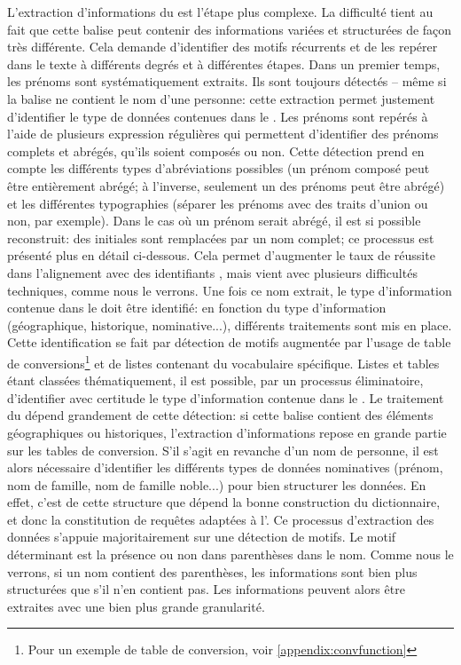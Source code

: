 L'extraction d'informations du \tname{} est l'étape plus complexe. La difficulté tient au fait que cette balise peut contenir des informations variées et structurées de façon très différente. Cela demande d'identifier des motifs récurrents et de les repérer dans le texte à différents degrés et à différentes étapes. Dans un premier temps, les prénoms sont systématiquement extraits. Ils sont toujours détectés -- même si la balise ne contient le nom d'une personne: cette extraction permet justement d'identifier le type de données contenues dans le \tname{}. Les prénoms sont repérés à l'aide de plusieurs \glspl{expression régulière} qui permettent d'identifier des prénoms complets et abrégés, qu'ils soient composés ou non. Cette détection prend en compte les différents types d'abréviations possibles (un prénom composé peut être entièrement abrégé; à l'inverse, seulement un des prénoms peut être abrégé) et les différentes typographies (séparer les prénoms avec des traits d'union ou non, par exemple). Dans le cas où un prénom serait abrégé, il est si possible reconstruit: des initiales sont remplacées par un nom complet; ce processus est présenté plus en détail ci-dessous. Cela permet d'augmenter le taux de réussite dans l'alignement avec des identifiants \wkd{}, mais vient avec plusieurs difficultés techniques, comme nous le verrons. Une fois ce nom extrait, le type d'information contenue dans le \tname{} doit être identifié: en fonction du type d'information (géographique, historique, nominative...), différents traitements sont mis en place. Cette identification se fait par détection de motifs augmentée par l'usage de \glspl{table de conversion}\footnote{Pour un exemple de table de conversion, voir \ref{appendix:convfunction}} et de listes contenant du vocabulaire spécifique. Listes et tables étant classées thématiquement, il est possible, par un processus éliminatoire, d'identifier avec certitude le type d'information contenue dans le \tname{}. Le traitement du \tname{} dépend grandement de cette détection: si cette balise contient des éléments géographiques ou historiques, l'extraction d'informations repose en grande partie sur les tables de conversion. S'il s'agit en revanche d'un nom de personne, il est alors nécessaire d'identifier les différents types de données nominatives (prénom, nom de famille, nom de famille noble...) pour bien structurer les données. En effet, c'est de cette structure que dépend la bonne construction du \gls{dictionnaire}, et donc la constitution de requêtes adaptées à l'\api{}. Ce processus d'extraction des données s'appuie majoritairement sur une détection de motifs. Le motif déterminant est la présence ou non dans parenthèses dans le nom. Comme nous le verrons, si un nom contient des parenthèses, les informations sont bien plus structurées que s'il n'en contient pas. Les informations peuvent alors être extraites avec une bien plus grande granularité.

